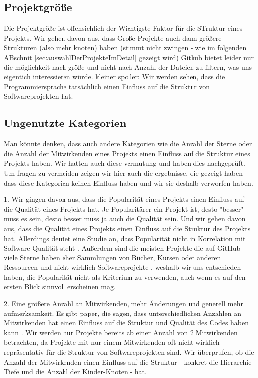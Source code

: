 \subsection*{Projektgröße} Die Projektgröße ist offensichlich der Wichtigste Faktor für die STruktur eines Projekts. Wir gehen davon aus, dass Große Projekte auch dann größere Strukturen (also mehr knoten) haben (stimmt nicht zwingen - wie im folgenden ABschnit \ref{sec:auswahlDerProjekteImDetail} gezeigt wird) Github bietet leider nur die möglichkeit nach größe und nicht nach Anzahl der Dateien zu filtern, was uns eigentich interessieren würde. 
kleiner spoiler: Wir werden sehen, dass die Programmiersprache tatsächlich einen Einfluss auf die Struktur von Softwareprojekten hat.

\subsection*{Ungenutzte Kategorien}
Man könnte denken, dass auch andere Kategorien wie die Anzahl der Sterne oder die Anzahl der Mitwirkenden eines Projekts einen Einfluss auf die Struktur eines Projekts haben. Wir hatten auch diese vermutung und haben dies nachgeprüft. Um fragen zu vermeiden zeigen wir hier auch die ergebnisse, die gezeigt haben dass diese Kategorien keinen Einfluss haben und wir sie deshalb verworfen haben.

1. Wir gingen davon aus, dass die Popularität eines Projekts einen Einfluss auf die Qualität eines Projekts hat. Je Popularitärer ein Projekt ist, desto "besser" muss es sein, desto besser muss ja auch die Qualität sein. Und wir gehen davon aus, dass die Qualität eines Projekts einen Einfluss auf die Struktur des Projekts hat. Allerdings deutet eine Studie an, dass Popularität nicht in Korrelation mit Software Qualität steht \cite{popAndQuality}. Außerdem sind die meisten Projekte die auf GitHub viele Sterne haben eher Sammlungen von Bücher, Kursen oder anderen Ressourcen und nicht wirklich Softwareprojekte \cite{evanli_github-ranking_2025}, weshalb wir uns entschieden haben, die Popularität nicht als Kriterium zu verwenden, auch wenn es auf den ersten Blick sinnvoll erscheinen mag.

2. Eine größere Anzahl an Mitwirkenden, mehr Änderungen und generell mehr aufmerksamkeit. 
Es gibt paper, die sagen, dass unterschiedlichen Anzahlen an Mitwirkenden hat einen Einfluss auf die Struktur und Qualität des Codes haben kann \cite{numDevs}. Wir werden nur Projekte bereits ab einer Anzahl von 2 Mitwirkenden betrachten, da Projekte mit nur einem Mitwirkenden oft nicht wirklich repräsentativ für die Struktur von Softwareprojekten sind. 
Wir überprufen, ob die Anzahl der Mitwirkenden einen Einfluss auf die Struktur - konkret die Hierarchie-Tiefe und die Anzahl der Kinder-Knoten - hat.

